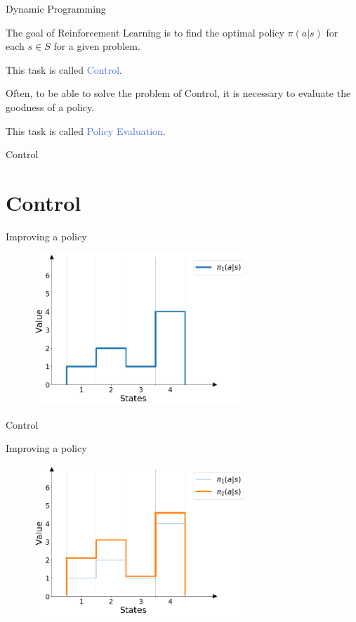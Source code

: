 \documentclass{beamer}
\begin{document}
\begin{frame}{Dynamic Programming}

The goal of Reinforcement Learning is to find the optimal policy $\pi(a|s)$ for each $s \in S$ for a given problem. 

This task is called \textcolor{RoyalBlue}{Control}.

\vspace{3mm}

Often, to be able to solve the problem of Control, it is necessary to evaluate the goodness of a policy.

This task is called \textcolor{RoyalBlue}{Policy Evaluation}.

\end{frame}



\begin{frame}{Control}
\section{Control}

Improving a policy

\begin{figure}[t]
\includegraphics[width=8cm]{./images/pi1.png}
\centering
\end{figure}

\end{frame}


\begin{frame}{Control}

Improving a policy

\begin{figure}[t]
\includegraphics[width=8cm]{./images/pi2.png}
\centering
\end{figure}

\end{frame}
\end{document}
